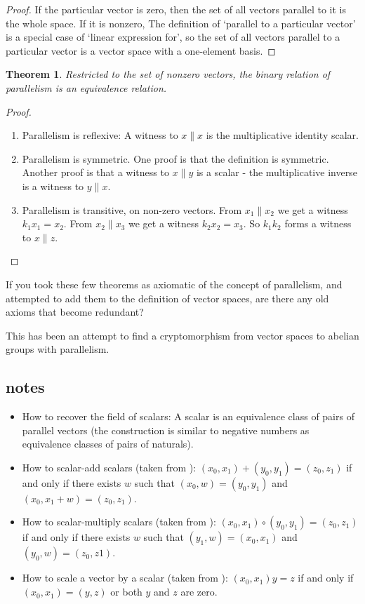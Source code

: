 \documentclass[11pt, noamsfonts]{amsart}
\newtheorem{theorem}{Theorem}
\begin{document}
\begin{proof}
If the particular vector is zero, then the set of all vectors parallel to it is the whole space. If it is nonzero,
The definition of `parallel to a particular vector' is a special case of `linear expression for', so the set of all vectors parallel to a particular vector is a vector space with a one-element basis.
\end{proof}

\begin{theorem}
Restricted to the set of nonzero vectors, the binary relation of parallelism is an equivalence relation.
\end{theorem}

\begin{proof}
\begin{enumerate}
    \item Parallelism is reflexive: A witness to \(x \parallel x\) is the multiplicative identity scalar.
    \item Parallelism is symmetric. One proof is that the definition is symmetric. Another proof is that a witness to \(x \parallel y\) is a scalar - the multiplicative inverse is a witness to \(y \parallel x\).
    \item Parallelism is transitive, on non-zero vectors. 
    From \(x_1 \parallel x_2\) we get a witness \(k_1 x_1 = x_2\).
    From \(x_2 \parallel x_3\) we get a witness \(k_2 x_2 = x_3\).
    So \(k_1 k_2\) forms a witness to \(x \parallel z\).
\end{enumerate}
\end{proof}

If you took these few theorems as axiomatic of the concept of parallelism, and attempted to add them to the definition of vector spaces, are there any old axioms that become redundant?

This has been an attempt to find a cryptomorphism from vector spaces to abelian groups with parallelism.

\subsection{notes}

\begin{itemize}
\item How to recover the field of scalars: A scalar is an equivalence class of pairs of parallel vectors (the construction is similar to negative numbers as equivalence classes of pairs of naturals). 
\item How to scalar-add scalars (taken from \cite{pierce2009model}):
\(
(x_0, x_1) + (y_0, y_1) = (z_0, z_1)
\)
if and only if there exists \(w\) such that
\( (x_0, w) = (y_0, y_1) \) and \( (x_0, x_1 + w) = (z_0, z_1) \).
\item
How to scalar-multiply scalars (taken from \cite{pierce2009model}):
\( (x_0, x_1) \circ (y_0, y_1) = (z_0, z_1) \)
if and only if there exists \(w\) such that
\(
(y_1, w) = (x_0, x_1 )
\)
and
\(
(y_0, w) = (z_0, z1)
\).
\item
How to scale a vector by a scalar (taken from \cite{pierce2009model}):
\(
(x_0, x_1) y = z
\)
if and only if
\(
(x_0, x_1) = (y, z) 
\)
or both \(y\) and \(z\) are zero.
\end{itemize}



\end{document}
